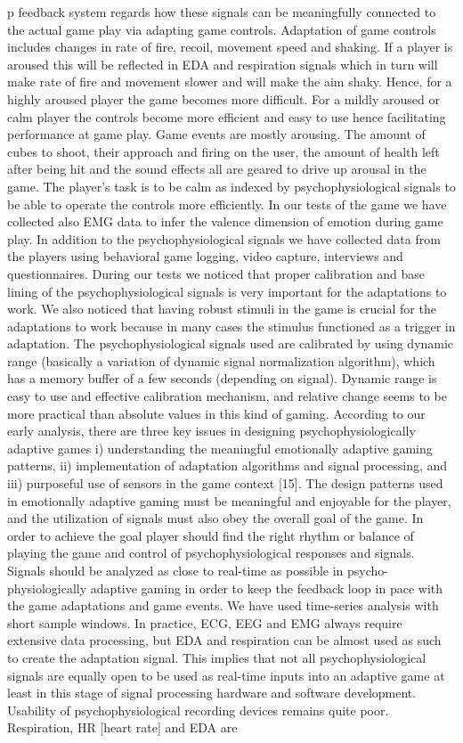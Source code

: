 p feedback system regards how these signals can be meaningfully connected to the actual game play via adapting game controls.  Adaptation of game controls includes changes in rate of fire, recoil, movement speed and shaking. If a player is aroused this will be reflected in EDA and respiration signals which in turn will make rate of fire and movement slower and will make the aim shaky. Hence, for a highly aroused player the game becomes more difficult. For a mildly aroused or calm player the controls become more efficient and easy to use hence facilitating performance at game play. Game events are mostly arousing. The amount of cubes to shoot, their approach and firing on the user, the amount of health left after being hit and the sound effects all are geared to drive up arousal in the game. The player’s task is to be calm as indexed by psychophysiological signals to be able to operate the controls more efficiently. In our tests of the game we have collected also EMG data to infer the valence dimension of emotion during game play. In addition to the psychophysiological signals we have collected data from the players using behavioral game logging, video capture, interviews and questionnaires. During our tests we noticed that proper calibration and base lining of the psychophysiological signals is very important for the adaptations to work. We also noticed that having robust stimuli in the game is crucial for the adaptations to work because in many cases the stimulus functioned as a trigger in adaptation. The psychophysiological signals used are calibrated by using dynamic range (basically a variation of dynamic signal normalization algorithm), which has a memory buffer of a few seconds (depending on signal). Dynamic range is easy to use and effective calibration mechanism, and relative change seems to be more practical than absolute values in this kind of gaming.  According to our early analysis, there are three key issues in designing psychophysiologically adaptive games i) understanding the meaningful emotionally adaptive gaming patterns, ii) implementation of adaptation algorithms and signal processing, and iii) purposeful use of sensors in the game context [15]. The design patterns used in emotionally adaptive gaming must be meaningful and enjoyable for the player, and the utilization of signals must also obey the overall goal of the game. In order to achieve the goal player should find the right rhythm or balance of playing the game and control of psychophysiological responses and signals.   Signals should be analyzed as close to real-time as possible in psycho- physiologically adaptive gaming in order to keep the feedback loop in pace with the game adaptations and game events. We have used time-series analysis with short sample windows. In practice, ECG, EEG and EMG always require extensive data processing, but EDA and respiration can be almost used as such to create the adaptation signal. This implies that not all psychophysiological signals are equally open to be used as real-time inputs into an adaptive game at least in this stage of signal processing hardware and software development. Usability of psychophysiological recording devices remains quite poor. Respiration, HR [heart rate] and EDA are 